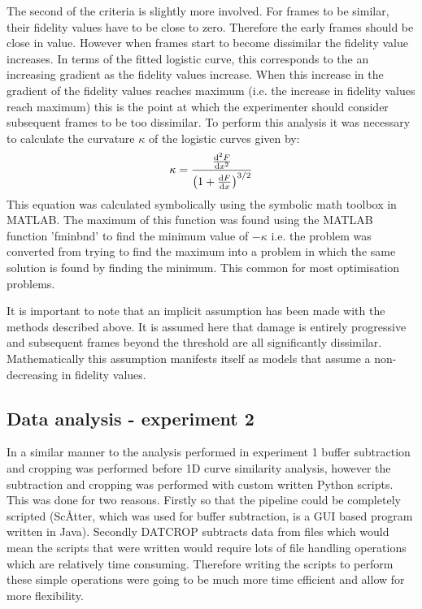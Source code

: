 The second of the criteria is slightly more involved. For frames to be similar, their fidelity values have to be close to zero.
Therefore the early frames should be close in value.
However when frames start to become dissimilar the fidelity value increases.
In terms of the fitted logistic curve, this corresponds to the an increasing gradient as the fidelity values increase.
When this increase in the gradient of the fidelity values reaches maximum (i.e. the increase in fidelity values reach maximum) this is the point at which the experimenter should consider subsequent frames to be too dissimilar.
To perform this analysis it was necessary to calculate the curvature $\kappa$ of the logistic curves given by:
\begin{equation}
    \kappa = \frac{\frac{\mathrm{d}^2F}{\mathrm{d}x^2}}{\left( 1 + \frac{\mathrm{d}F}{\mathrm{d}x}\right)^{3/2}}
    \label{eq:Curvature}
\end{equation}
This equation was calculated symbolically using the symbolic math toolbox in MATLAB. The maximum of this function was found using the MATLAB function 'fminbnd' to find the minimum value of $-\kappa$ i.e. the problem was converted from trying to find the maximum into a problem in which the same solution is found by finding the minimum. This common for most optimisation problems.

It is important to note that an implicit assumption has been made with the methods described above.
It is assumed here that damage is entirely progressive and subsequent frames beyond the threshold are all significantly dissimilar.
Mathematically this assumption manifests itself as models that assume a non-decreasing in fidelity values.

\subsection{Data analysis - experiment 2}
\label{sub:Data analysis - experiment 2}
In a similar manner to the analysis performed in experiment 1 buffer subtraction and cropping was performed before 1D curve similarity analysis, however the subtraction and cropping was performed with custom written Python scripts.
This was done for two reasons.
Firstly so that the pipeline could be completely scripted (Sc\AA tter, which was used for buffer subtraction, is a GUI based program written in Java).
Secondly DATCROP subtracts data from files which would mean the scripts that were written would require lots of file handling operations which are relatively time consuming.
Therefore writing the scripts to perform these simple operations were going to be much more time efficient and allow for more flexibility.

